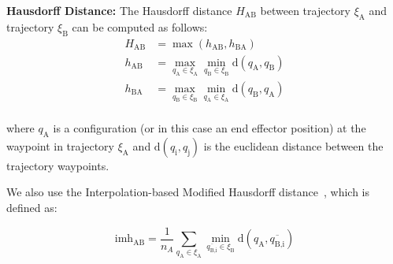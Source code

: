 \documentclass[letterpaper, 10 pt, conference]{ieeeconf}  %
\newcommand{\tj}[1]{\ensuremath{\xi_\text{#1}}}
\begin{document}





{\bf Hausdorff Distance:}
The Hausdorff distance $H_\text{AB}$ between trajectory $\xi_\text{A}$ and trajectory $\xi_\text{B}$ can be computed as follows:
\begin{equation}
\begin{aligned}
H_\text{AB} &= \max (h_{\text{AB}}, h_{\text{BA}}) \\
h_{\text{AB}} &= \max_{q_\text{A} \in \xi_\text{A}} \min_{q_\text{B} \in \xi_\text{B}} \text{d}(q_\text{A}, q_\text{B})\\
h_{\text{BA}} &= \max_{q_\text{B} \in \xi_\text{B}} \min_{q_\text{A} \in \xi_\text{A}} \text{d}(q_\text{B}, q_\text{A})\\
\end{aligned}
\end{equation}

where $q_\text{A}$ is a configuration (or in this case an end effector position) at the waypoint in trajectory \tj{A} and $\text{d}(q_\text{i}, q_\text{j})$ is the euclidean distance between the trajectory waypoints.

We also use the Interpolation-based Modified Hausdorff distance~\cite{dubuisson1994modified}, which is defined as:

\begin{equation}
\text{imh}_\text{AB} = \frac{1}{n_A} \sum_{q_\text{A} \in \xi_\text{A}} \min_{\overline{q_\text{B,i}} \in \xi_\text{B}} \text{d}(q_\text{A}, \overline{q_\text{B,i}})
\end{equation}
\end{document}
